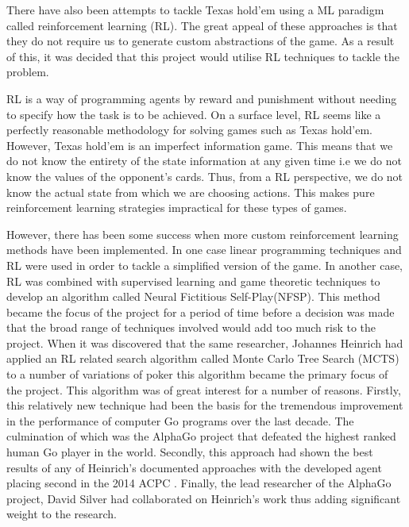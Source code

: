 There have also been attempts to tackle Texas hold'em using a ML paradigm called reinforcement
learning (RL).
The great appeal of these approaches is that they do not require us to generate custom abstractions of the game.
As a result of this, it was decided that this project would utilise RL techniques to tackle the problem.

RL is a way of programming agents by reward and punishment without needing to specify how the
task is to be achieved\citep{kaelbling1996reinforcement}.
On a surface level, RL seems like a perfectly reasonable methodology for solving games such as Texas hold'em.
However, Texas hold'em is an imperfect information game.
This means that we do not know the entirety of the state information at any given time
i.e we do not know the values of the opponent's cards.
Thus, from a RL perspective, we do not know the actual state from which we are choosing actions.
This makes pure reinforcement learning strategies impractical for these types of games.

However, there has been some success when more custom reinforcement learning methods have been implemented.
In one case linear programming techniques and RL were used in order to tackle a
simplified version of the game\citep{dahl2001reinforcement}.
In another case, RL was combined with supervised learning and game theoretic
techniques\citep{heinrich2016deep} to develop an algorithm called Neural Fictitious Self-Play(NFSP).
This method became the focus of the project for a period of time before a decision was made
that the broad range of techniques involved would add too much risk to the project.
When it was discovered that the same researcher, Johannes Heinrich had applied an RL related search
algorithm called Monte Carlo Tree Search (MCTS) to a number of variations of poker\citep{heinrich2015smooth}
this algorithm became the primary focus of the project.
This algorithm was of great interest for a number of reasons.
Firstly, this relatively new technique had been the basis for the tremendous improvement in the
performance of computer Go programs over the last decade.
The culmination of which was the AlphaGo project that defeated the highest ranked human Go player in
the world\citep{silver2016mastering}.
Secondly, this approach had shown the best results of any of Heinrich's documented approaches
with the developed agent placing second in the 2014 ACPC .
Finally, the lead researcher of the AlphaGo project, David Silver had collaborated on Heinrich's
work thus adding significant weight to the research.


